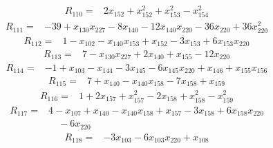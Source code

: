 \begin{equation*}\begin{split}
R_{110}={}&2x_{152} + x_{152}^{2} + x_{153}^{2} - x_{154}^{2}
\end{split}\end{equation*}
\begin{equation*}\begin{split}
R_{111}={}&-39 + x_{130} x_{227} - 8x_{140} - 12x_{140} x_{220} - 36x_{220} + 36x_{220}^{2}
\end{split}\end{equation*}
\begin{equation*}\begin{split}
R_{112}={}&1 - x_{102} - x_{140} x_{153} + x_{152} - 3x_{153} + 6x_{153} x_{220}
\end{split}\end{equation*}
\begin{equation*}\begin{split}
R_{113}={}&7 - x_{130} x_{227} + 2x_{140} + x_{155} - 12x_{220}
\end{split}\end{equation*}
\begin{equation*}\begin{split}
R_{114}={}&-1 + x_{103} - x_{144} - 3x_{145} - 6x_{145} x_{220} + x_{146} + x_{155} x_{156}
\end{split}\end{equation*}
\begin{equation*}\begin{split}
R_{115}={}&7 + x_{140} - x_{140} x_{158} - 7x_{158} + x_{159}
\end{split}\end{equation*}
\begin{equation*}\begin{split}
R_{116}={}&1 + 2x_{157} + x_{157}^{2} - 2x_{158} + x_{158}^{2} - x_{159}^{2}
\end{split}\end{equation*}
\begin{equation*}\begin{split}
R_{117}={}&4 - x_{107} + x_{140} - x_{140} x_{158} + x_{157} - 3x_{158} + 6x_{158} x_{220}\\
&\quad -6x_{220}
\end{split}\end{equation*}
\begin{equation*}\begin{split}
R_{118}={}&-3x_{103} - 6x_{103} x_{220} + x_{108}
\end{split}\end{equation*}
